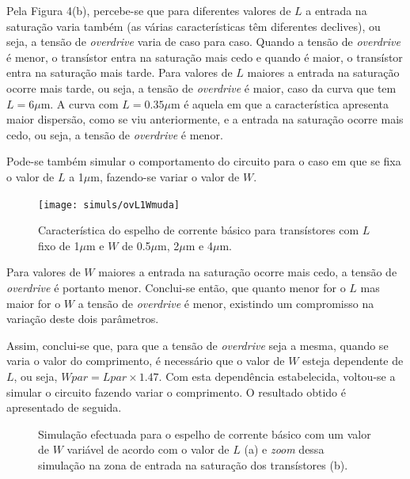 \documentclass[11pt]{article}
\numberwithin{equation}{section}
\begin{document}
Pela Figura 4(b), percebe-se que para diferentes valores de $L$ a entrada na saturação varia também (as várias características têm diferentes declives), ou seja, a tensão de \textit{overdrive} varia de caso para caso. Quando a tensão de \textit{overdrive} é menor, o transístor entra na saturação mais cedo e quando é maior, o transístor entra na saturação mais tarde. Para valores de $L$ maiores a entrada na saturação ocorre mais tarde, ou seja, a tensão de \textit{overdrive} é maior, caso da curva que tem $L = 6\mu$m. A curva com $L = 0.35\mu$m é aquela em que a característica apresenta maior dispersão, como se viu anteriormente, e a entrada na saturação ocorre mais cedo, ou seja, a tensão de \textit{overdrive} é menor.

Pode-se também simular o comportamento do circuito para o caso em que se fixa o valor de $L$ a 1$\mu$m, fazendo-se variar o valor de $W$.

\begin{figure}[H]
	\centering
	\texttt{[image: simuls/ovL1Wmuda]}
	\vspace{-0.8em}
	\caption{Característica do espelho de corrente básico para transístores com $L$ fixo de 1$\mu$m e $W$ de 0.5$\mu$m, 2$\mu$m e 4$\mu$m.}
	\vspace{-0.8em}
\end{figure} 

Para valores de $W$ maiores a entrada na saturação ocorre mais cedo, a tensão de \textit{overdrive} é portanto menor. Conclui-se então, que quanto menor for o $L$ mas maior for o $W$ a tensão de \textit{overdrive} é menor, existindo um compromisso na variação deste dois parâmetros.

Assim, conclui-se que, para que a tensão de \textit{overdrive} seja a mesma, quando se varia o valor do comprimento, é necessário que o valor de $W$ esteja dependente de $L$, ou seja, $Wpar = Lpar\times1.47$. Com esta dependência estabelecida, voltou-se a simular o circuito fazendo variar o comprimento. O resultado obtido é apresentado de seguida.

\begin{figure}[H]
	\centering
\end{figure}

\begin{figure}[H]
	\centering
	\vspace{-0.8em}
	\caption{Simulação efectuada para o espelho de corrente básico com um valor de $W$ variável de acordo com o valor de $L$ (a) e \textit{zoom} dessa simulação na zona de entrada na saturação dos transístores (b).}
	\vspace{-0.8em}
\end{figure}
\end{document}
